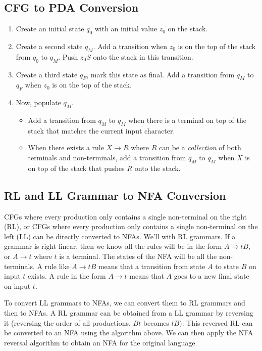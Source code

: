 \subsection{CFG to PDA Conversion}
\begin{enumerate}
    \item Create an initial state $q_0$ with an initial value $z_0$ on the stack.
    \item Create a second state $q_M$. Add a transition when $z_0$ is on the
    top of the stack from $q_0$ to $q_M$. Push $z_0S$ onto the stack in this
    transition.
    \item Create a third state $q_F$, mark this state as final. Add a transition
    from $q_M$ to $q_F$ when $z_0$ is on the top of the stack.
    \item Now, populate $q_M$.
    \begin{itemize}
        \item Add a transition from $q_M$ to $q_M$ when there is a terminal 
        on top of the stack that matches the current input character.
        \item When there exists a rule
        $X \to R$ where $R$ can be a \textit{collection} of both terminals and
        non-terminals, add a transition from $q_M$ to $q_M$ when $X$ is on
        top of the stack that pushes $R$ onto the stack.
    \end{itemize}
\end{enumerate}

\subsection{RL and LL Grammar to NFA Conversion}
CFGs where every production only contains a single non-terminal on
the right (RL), or CFGs where every production only contains a single
non-terminal on the left (LL) can be directly converted to NFAs.
We'll with RL grammars. If a grammar is right linear, then we know
all the rules will be in the form $A \to tB$, or $A \to t$ where $t$ is
a terminal. The states of the NFA will be all the non-terminals.  A rule
like $A \to tB$ means that a transition from state $A$ to state $B$ on
input $t$ exists. A rule in the form $A \to t$ means that $A$ goes to a new
final state on input $t$.

To convert LL grammars to NFAs, we can convert them to RL grammars and then
to NFAs. A RL grammar can be obtained from a LL grammar by reversing it (reversing
the order of all productions. $Bt$ becomes $tB$). This
reversed RL can be converted to an NFA using the algorithm above. We can then
apply the NFA reversal algorithm to obtain an NFA for the original language.

